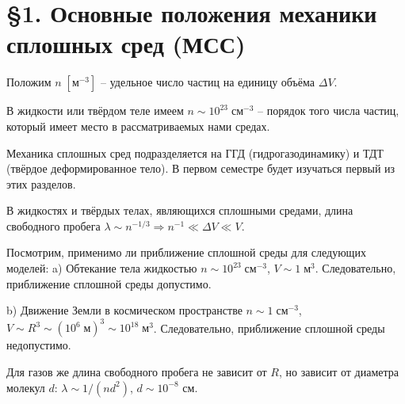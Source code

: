 \section{\S 1. Основные положения механики сплошных сред (МСС)}
\newpage
Положим $n \; [\text{м}^{-3}]$ -- удельное число частиц на единицу объёма $\Delta V$.

В жидкости или твёрдом теле имеем $n \sim 10^{23} \; \text{см}^{-3}$ -- порядок того числа частиц, который имеет место в рассматриваемых нами средах.

Механика сплошных сред подразделяется на ГГД (гидрогазодинамику) и ТДТ (твёрдое деформированное тело).
В первом семестре будет изучаться первый из этих разделов.

В жидкостях и твёрдых телах, являющихся сплошными средами, длина свободного пробега $\lambda \sim n^{-1/3} \Rightarrow n^{-1} \ll \Delta V \ll V$.

Посмотрим, применимо ли приближение сплошной среды для следующих моделей:
a) Обтекание тела жидкостью
$n \sim 10^{23} \; \text{см}^{-3}$,
$V \sim 1\; \text{м}^{3}$.
Следовательно, приближение сплошной среды допустимо.

b) Движение Земли в космическом пространстве
$n \sim 1\; \text{см}^{-3}$,
$V \sim R^{3} \sim (10^6\; \text{м})^{3} \sim 10^{18}\; \text{м}^{3}$.
Следовательно, приближение сплошной среды недопустимо.

Для газов же длина свободного пробега не зависит от $R$, но зависит от диаметра молекул $d$: $\lambda \sim 1/(nd^2)$, $d \sim 10^{-8}$ см.
